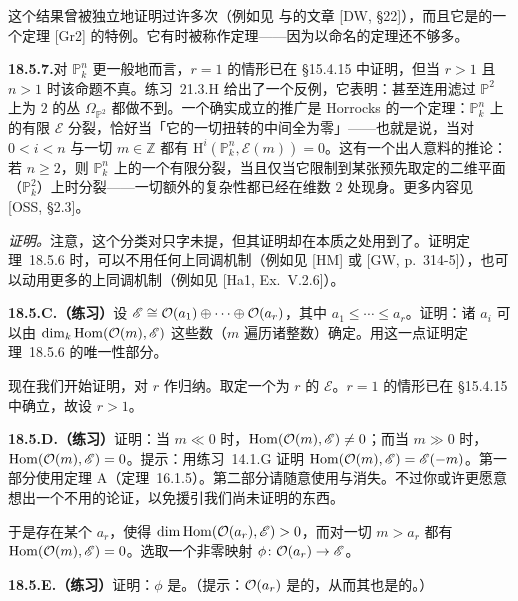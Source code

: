这个结果曾被独立地证明过许多次（例如见 \trDedekind{}与\trWeber{}的文章 [DW, \S22]），而且它是\trGrothendieck{}的一个定理 [Gr2] 的特例。它有时被称作\trGrothendieck{}定理——因为以\trGrothendieck{}命名的定理还不够多。

\textbf{18.5.7.}\quad 对 $\mathbb{P}^n_k$ 更一般地而言，$r=1$ 的情形已在 \S15.4.15 中证明，但当 $r>1$ 且 $n>1$ 时该命题不真。\mbox{练习~21.3.H} 给出了一个反例，它表明：甚至连用\trLineBundle{}滤过 $\mathbb{P}^2$ 上\trRank{}为 $2$ 的丛 $\Omega_{\mathbb{P}^2}$ 都做不到。一个确实成立的推广是 Horrocks 的一个定理：$\mathbb{P}^n_k$ 上的有限\trRank{}\trLocallyFreeSheaf{} $\mathscr{E}$ 分裂，恰好当「它的一切扭转的中间\trCohomology{}全为零」——也就是说，当对 $0<i<n$ 与一切 $m\in\mathbb{Z}$ 都有 $\mathrm{H}^i(\mathbb{P}^n_k,\mathscr{E}(m))=0$。这有一个出人意料的推论：若 $n\ge 2$，则 $\mathbb{P}^n_k$ 上的一个有限\trRank{}\trLocallyFreeSheaf{}分裂，当且仅当它限制到某张预先取定的二维平面（$\mathbb{P}^2_k$）上时分裂——一切额外的复杂性都已经在维数 $2$ 处现身。更多内容见 [OSS, \S2.3]。

\emph{证明。}\quad 注意，这个分类对\trCohomology{}只字未提，但其证明却在本质之处用到了\trCohomology。证明\mbox{定理~18.5.6} 时，可以不用任何上同调机制（例如见 [HM] 或 [GW, p.~314-5]），也可以动用更多的上同调机制（例如见 [Ha1, Ex.~V.2.6]）。

\textbf{18.5.C.（练习）}\quad 设 $\mathscr{E}\cong\mathcal{O}(a_1)\oplus\cdots\oplus\mathcal{O}(a_r)$，其中 $a_1\le\cdots\le a_r$。证明：诸 $a_i$ 可以由 $\dim_k\operatorname{Hom}(\mathcal{O}(m),\mathscr{E})$ 这些数（$m$ 遍历诸整数）确定。用这一点证明\mbox{定理~18.5.6} 的唯一性部分。

现在我们开始证明，对 $r$ 作归纳。取定一个\trRank{}为 $r$ 的\trLocallyFreeSheaf{} $\mathscr{E}$。$r=1$ 的情形已在 \S15.4.15 中确立，故设 $r>1$。

\textbf{18.5.D.（练习）}\quad 证明：当 $m\ll 0$ 时，$\operatorname{Hom}(\mathcal{O}(m),\mathscr{E})\ne 0$；而当 $m\gg 0$ 时，$\operatorname{Hom}(\mathcal{O}(m),\mathscr{E})=0$。提示：用\mbox{练习~14.1.G} 证明 $\operatorname{Hom}(\mathcal{O}(m),\mathscr{E})=\mathscr{E}(-m)$。第一部分使用\trSerre{}定理 A（\mbox{定理~16.1.5}）。第二部分请随意使用\trSerreDuality{}与\trSerre{}消失。不过你或许更愿意想出一个不用\trSerreDuality{}的论证，以免援引我们尚未证明的东西。

于是存在某个 $a_r$，使得 $\dim\operatorname{Hom}(\mathcal{O}(a_r),\mathscr{E})>0$，而对一切 $m>a_r$ 都有 $\operatorname{Hom}(\mathcal{O}(m),\mathscr{E})=0$。选取一个非零映射 $\phi\colon\mathcal{O}(a_r)\to\mathscr{E}$。

\textbf{18.5.E.（练习）}\quad 证明：$\phi$ 是\trInjectiveMap。（提示：$\mathcal{O}(a_r)$ 是\trTorsionFree{}的，从而其\trKernel{}也是\trTorsionFree{}的。）

